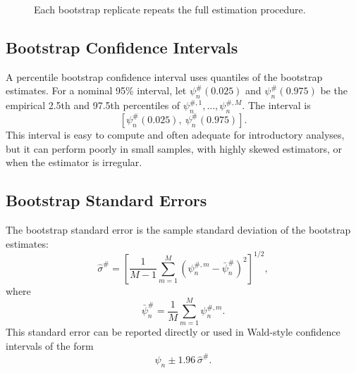 \begin{figure}[H]
\centering
{}
\caption{Each bootstrap replicate repeats the full estimation procedure.}
\label{fig:ch4-bootstrap-flow}
\end{figure}

\subsection{Bootstrap Confidence Intervals}

A percentile bootstrap confidence interval uses quantiles of the bootstrap estimates.
For a nominal 95\% interval, let $\psi_n^\#(0.025)$ and $\psi_n^\#(0.975)$ be the
empirical 2.5th and 97.5th percentiles of
$\psi_n^{\#,1},\ldots,\psi_n^{\#,M}$. The interval is
\[
\left[
\psi_n^\#(0.025),\ \psi_n^\#(0.975)
\right].
\]
This interval is easy to compute and often adequate for introductory analyses, but it
can perform poorly in small samples, with highly skewed estimators, or when the
estimator is irregular.

\subsection{Bootstrap Standard Errors}

The bootstrap standard error is the sample standard deviation of the bootstrap
estimates:
\[
\hat\sigma^\#
=
\left[
\frac{1}{M-1}\sum_{m=1}^M
\left(\psi_n^{\#,m}-\bar\psi_n^\#\right)^2
\right]^{1/2},
\]
where
\[
\bar\psi_n^\#=\frac{1}{M}\sum_{m=1}^M \psi_n^{\#,m}.
\]
This standard error can be reported directly or used in Wald-style confidence
intervals of the form
\[
\psi_n\pm 1.96\,\hat\sigma^\#.
\]

